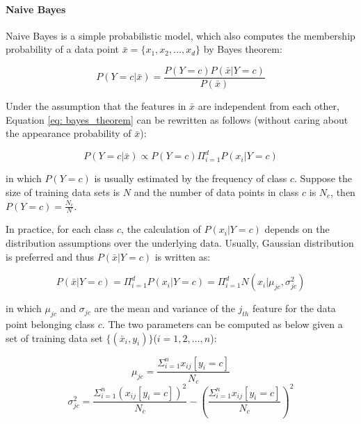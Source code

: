 \paragraph{Naive Bayes} Naive Bayes is a simple probabilistic model, which also computes the membership probability of a data point $\bar{x} = \{x_1, x_2, \dots, x_d\}$ by Bayes theorem:

\begin{equation}\label{eq: bayes_theorem}
P(Y=c|\bar{x}) = \frac{P(Y=c)P(\bar{x}|Y=c)}{P(\bar{x})}    
\end{equation}

Under the assumption that the features in $\bar{x}$ are independent from each other, Equation \ref{eq: bayes_theorem} can be rewritten as follows (without caring about the appearance probability of $\bar{x}$):

\begin{equation}\label{eq: nb_exp}
    P(Y=c|\bar{x}) \propto P(Y=c)\Pi_{i=1}^dP(x_i|Y=c)
\end{equation}

in which $P(Y=c)$ is usually estimated by the frequency of class $c$. Suppose the size of training data sets is $N$ and the number of data points in class $c$ is $N_c$, then $P(Y=c) = \frac{N_c}{N}$.

In practice, for each class $c$, the calculation of $P(x_i|Y=c)$ depends on the distribution assumptions over the underlying data. Usually, Gaussian distribution is preferred and thus $P(\bar{x}|Y=c)$ is written as:

\begin{equation}\label{eq: nb_guassian}
    P(\bar{x}|Y=c) = \Pi_{i=1}^dP(x_i|Y=c) = \Pi_{i=1}^dN(x_i|\mu_{jc}, \sigma_{jc}^2)
\end{equation}

in which $\mu_{jc}$ and $\sigma_{jc}$ are the mean and variance of the $j_{th}$ feature for the data point belonging class $c$. The two parameters can be computed as below given a set of training data set $\{(\bar{x}_i, y_i)\}$($i=1,2,\dots, n$):

\begin{equation}\label{eq: nb_mean}
    \mu_{jc} = \frac{\Sigma_{i=1}^nx_{ij}[y_i=c]}{N_c}
\end{equation}
\begin{equation}\label{eq: nb_var}
    \sigma_{jc}^2 = \frac{\Sigma_{i=1}^n(x_{ij}[y_i=c])^2}{N_c}-(\frac{\Sigma_{i=1}^nx_{ij}[y_i=c]}{N_c})^2
\end{equation}

